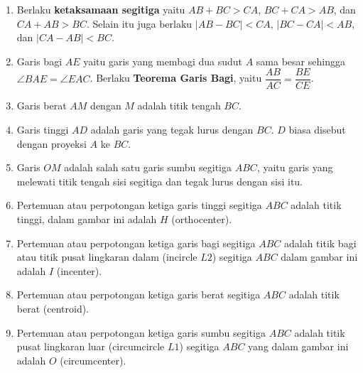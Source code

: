 \begin{enumerate}
    \item Berlaku \textbf{ketaksamaan segitiga} yaitu $AB+BC>CA$, $BC+CA>AB$, dan $CA+AB>BC$. Selain itu juga berlaku $|AB-BC|<CA$, $|BC-CA|<AB$, dan $|CA-AB|<BC$.
    \item Garis bagi $AE$ yaitu garis yang membagi dua sudut $A$ sama besar sehingga $\angle BAE = \angle EAC$. Berlaku \textbf{Teorema Garis Bagi}, yaitu $\dfrac{AB}{AC}=\dfrac{BE}{CE}$.
    \item Garis berat $AM$ dengan $M$ adalah titik tengah $BC$.
    \item Garis tinggi $AD$ adalah garis yang tegak lurus dengan $BC$. $D$ biasa disebut dengan proyeksi $A$ ke $BC$.
    \item Garis $OM$ adalah salah satu garis sumbu segitiga $ABC$, yaitu garis yang melewati titik tengah sisi segitiga dan tegak lurus dengan sisi itu.
    \item Pertemuan atau perpotongan ketiga garis tinggi segitiga $ABC$ adalah titik tinggi, dalam gambar ini adalah $H$ (orthocenter).
    \item Pertemuan atau perpotongan ketiga garis bagi segitiga $ABC$ adalah titik bagi atau titik pusat lingkaran dalam (incircle $L2$) segitiga $ABC$ dalam gambar ini adalah $I$ (incenter).
    \item Pertemuan atau perpotongan ketiga garis berat segitiga $ABC$ adalah titik berat (centroid).
    \item Pertemuan atau perpotongan ketiga garis sumbu segitiga $ABC$ adalah titik pusat lingkaran luar (circumcircle $L1$) segitiga $ABC$ yang dalam gambar ini adalah $O$ (circumcenter).
\end{enumerate}

